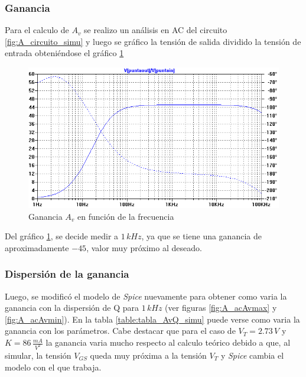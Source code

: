 \documentclass[10pt,spanish,a4paper,notitlepage]{article}
\begin{document}
\subsubsection{Ganancia}
Para el calculo de $A_v$ se realizo un análisis en AC del circuito \ref{fig:A_circuito_simu} y luego se gráfico la tensión de salida dividido la tensión de entrada obteniéndose el gráfico \ref{fig:A_acAv}

\begin{figure}[H]
\centering
\includegraphics[scale=0.7]{simulaciones/A_acAv.png}
\caption{Ganancia $A_v$ en función de la frecuencia}
\label{fig:A_acAv}
\end{figure}

Del gráfico \ref{fig:A_acAv}, se decide medir a $1\,\unit{kHz}$, ya que se tiene una ganancia de aproximadamente $-45$, valor muy próximo al deseado. 

\subsubsection{Dispersión de la ganancia}
Luego, se modificó el modelo de \emph{Spice} nuevamente para obtener como varia la ganancia con la dispersión de Q para $1\,\unit{kHz}$ (ver figuras \ref{fig:A_acAvmax} y \ref{fig:A_acAvmin}). En la tabla \ref{table:tabla_AvQ_simu} puede verse como varia la ganancia con los parámetros. Cabe destacar que para el caso de $V_{T}=2.73\,\unit{V}$ y $K=86\,\unit{\frac{mA}{V^2}}$ la ganancia varia mucho respecto al calculo teórico debido a que, al simular, la tensión $V_{GS}$ queda muy próxima a la tensión $V_{T}$ y \emph{Spice} cambia el modelo con el que trabaja.
\end{document}
